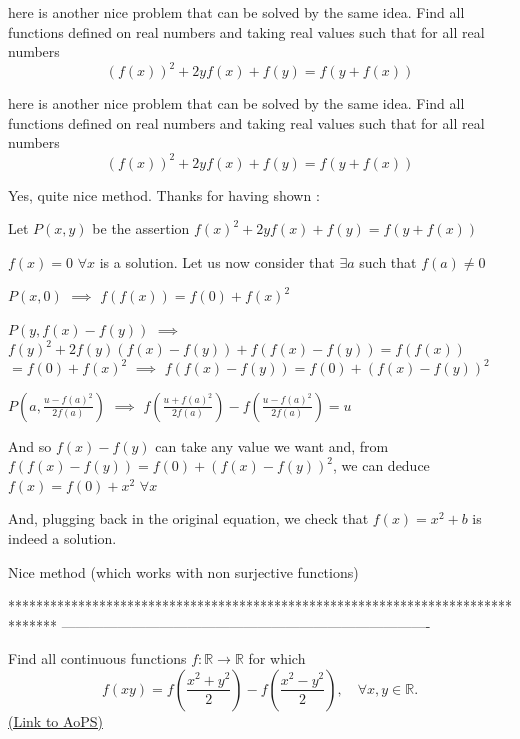 \begin{solution}
	here is another nice problem that can be solved by the same idea.
Find all functions  defined on real numbers and taking real values such that  for all real numbers  \[ (f(x))^2+2yf(x)+f(y)=f(y+f(x))\]
\end{solution}



\begin{solution}
	\begin{tcolorbox}here is another nice problem that can be solved by the same idea.
Find all functions  defined on real numbers and taking real values such that  for all real numbers
\[ (f(x))^2 + 2yf(x) + f(y) = f(y + f(x))\]
\end{tcolorbox}

Yes, quite nice method. Thanks for having shown :

Let $ P(x,y)$ be the assertion $ f(x)^2+2yf(x)+f(y)=f(y+f(x))$

$ \boxed{f(x)=0}$ $ \forall x$ is a solution. Let us now consider that $ \exists a$ such that $ f(a)\neq 0$

$ P(x,0)$ $ \implies$ $ f(f(x))=f(0)+f(x)^2$

$ P(y,f(x)-f(y))$ $ \implies$ $ f(y)^2+2f(y)(f(x)-f(y))+f(f(x)-f(y))=f(f(x))$ $ =f(0)+f(x)^2$ $ \implies$ $ f(f(x)-f(y))=f(0)+(f(x)-f(y))^2$

$ P(a,\frac{u-f(a)^2}{2f(a)})$ $ \implies$ $ f(\frac{u+f(a)^2}{2f(a)})-f(\frac{u-f(a)^2}{2f(a)})=u$

And so $ f(x)-f(y)$ can take any value we want and, from $ f(f(x)-f(y))=f(0)+(f(x)-f(y))^2$, we can deduce $ f(x)=f(0)+x^2$ $ \forall x$

And, plugging back in the original equation, we check that $ \boxed{f(x)=x^2+b}$ is indeed a solution.

Nice method (which works with non surjective functions)
\end{solution}
*******************************************************************************
-------------------------------------------------------------------------------

\begin{problem}
	Find all continuous functions $ f: \mathbb{R}\to\mathbb{R}$ for which
\[ f(xy)=f\left(\frac{x^{2}+y^{2}}{2}\right)-f\left(\frac{x^{2}-y^{2}}{2}\right), \quad \forall x,y \in \mathbb R.\]
	\flushright \href{https://artofproblemsolving.com/community/c6h296599}{(Link to AoPS)}
\end{problem}



